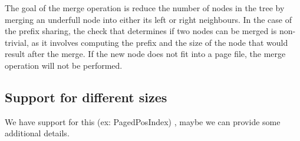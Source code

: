 \documentclass[11pt,a4paper,oneside]{article}
\begin{document}
The goal of the merge operation is reduce the number of nodes in the tree by merging an underfull node into either its left or right neighbours. In the case of the prefix sharing, the check that determines if two nodes can be merged is non-trivial, as it involves computing the prefix and the size of the node that would result after the merge. If the new node does not fit into a page file, the merge operation will not be performed.

\subsection{Support for different sizes}
We have support for this (ex: PagedPosIndex) , maybe we can provide some additional details.


\end{document}
